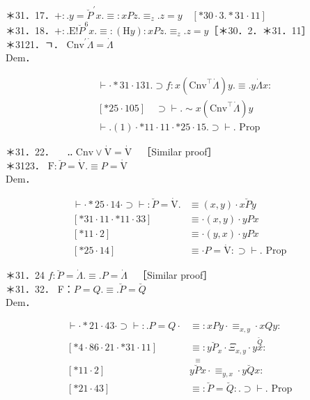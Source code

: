 \documentclass[10pt]{article}
\begin{document}
＊31．17．$+: . y=\breve{P}^{\prime} x . \equiv: x P z . \equiv_{z} . z=y \quad[* 30 \cdot 3 . * 31 \cdot 11]$\\
＊31．18．$+: . \mathrm{E}!\breve{P}^{6} x . \equiv:(\mathrm{H} y): x P z . \equiv_{z} . z=y$［＊30．2．＊31．11］\\
＊3121．ㄱ． $\mathrm{Cnv}^{\prime} \dot{\Lambda}=\dot{\Lambda}$\\
Dem．


\begin{align*}
& \vdash \cdot * 31 \cdot 131 . \supset f: x\left(\mathrm{Cnv}^{\top} \dot{\Lambda}\right) y . \equiv . y \dot{\Lambda} x: \\
& {[* 25 \cdot 105] \quad \supset \vdash . \sim x\left(\mathrm{Cnv}^{\top} \dot{\Lambda}\right) y}  \tag{1}\\
& \vdash .(1) \cdot * 11 \cdot 11 \cdot * 25 \cdot 15 . \supset \vdash . \text { Prop }
\end{align*}


＊31．22．$\quad$ ‥ $\mathrm{Cnv} \vee \dot{\mathrm{V}}=\dot{\mathrm{V}} \quad$［Similar proof］\\
＊3123． $\mathrm{F}: \breve{P}=\dot{\mathrm{V}} . \equiv P=\dot{\mathrm{V}}$\\
Dem．

$$
\begin{array}{ll}
\vdash \cdot * 25 \cdot 14 \cdot \supset \vdash: \breve{P}=\dot{\mathrm{V}} . & \equiv(x, y) \cdot x \breve{P} y \\
{[* 31 \cdot 11 \cdot * 11 \cdot 33]} & \equiv \cdot(x, y) \cdot y P x \\
{[* 11 \cdot 2]} & \equiv \cdot(y, x) \cdot y P x \\
{[* 25 \cdot 14]} & \equiv \cdot P=\dot{\mathrm{V}}: \supset \vdash . \text { Prop }
\end{array}
$$

＊31．24 $f: \breve{P}=\dot{\Lambda} . \equiv . P=\dot{\Lambda} \quad$［Similar proof］\\
＊31．32． F：$P=Q . \equiv . \breve{P}=\breve{Q}$\\
Dem．

$$
\begin{array}{ll}
\vdash \cdot * 21 \cdot 43 \cdot \supset \vdash: . P=Q \cdot & \equiv: x P y \cdot \equiv_{x, y} \cdot x Q y: \\
{[* 4 \cdot 86 \cdot 21 \cdot * 31 \cdot 11]} & \equiv: y \breve{P}_{x} \cdot \Xi_{x, y} \cdot y \stackrel{\breve{Q}}{x}: \\
{[* 11 \cdot 2]} & \stackrel{\equiv}{y \breve{P} x} \cdot \equiv_{y, x} \cdot y \breve{Q} x: \\
{[* 21 \cdot 43]} & \equiv: \breve{P}=\breve{Q}: . \supset \vdash . \text { Prop }
\end{array}
$$
\end{document}

